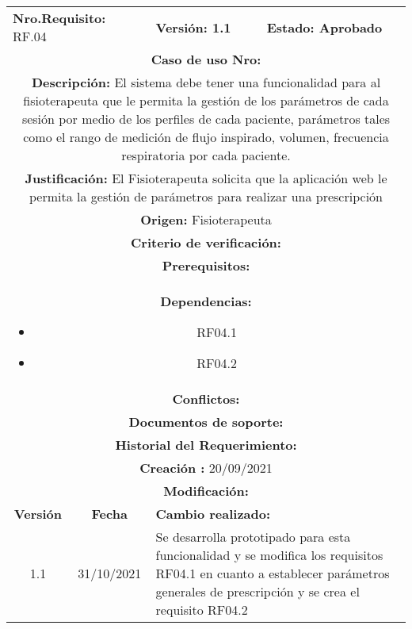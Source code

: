 \begin{center}
        
        \begin{tabular}{|c|c|p{4cm}|p{4cm}|}
            \hline
            \rowcolor{yellow} \multicolumn{4}{|c|}{\textbf{Prioridad:} Baja}  \\
            \hline
            \multicolumn{2}{|l}{\textbf{Nro.Requisito: }RF.04} & \multicolumn{1}{l|}{\textbf{Versión: 1.1 }} & \multicolumn{1}{|l|}{\textbf{Estado: Aprobado}}  \\
            \multicolumn{4}{|p{12cm}|}{\textbf{Caso de uso Nro: }}  \\
            \hline
            \multicolumn{4}{|p{13cm}|}{\textbf{Descripción: }El sistema debe tener una funcionalidad para al fisioterapeuta que le permita la gestión de los parámetros de cada sesión por medio de los perfiles de cada paciente, parámetros tales como el rango de medición de flujo inspirado, volumen, frecuencia respiratoria por cada paciente.}  \\
            \multicolumn{4}{|p{13cm}|}{\textbf{Justificación: }El Fisioterapeuta solicita que la aplicación web le permita la gestión de parámetros para realizar una prescripción}  \\
            \multicolumn{4}{|p{12cm}|}{\textbf{Origen: }Fisioterapeuta}  \\
            \multicolumn{4}{|p{13cm}|}{\textbf{Criterio de verificación: }}  \\
            \hline
            \multicolumn{4}{|p{13cm}|}{\textbf{Prerequisitos: }}  \\
            \hline \multicolumn{4}{|p{12cm}|}{\textbf{Dependencias: }
                \begin{itemize}
                \item RF04.1
                \item RF04.2
                \end{itemize}}  \\
            \multicolumn{4}{|p{12cm}|}{\textbf{Conflictos: }}  \\
            \hline
            \multicolumn{4}{|p{12cm}|}{\textbf{Documentos de soporte: }}  \\
            \hline
            \multicolumn{4}{|p{12cm}|}{\textbf{Historial del Requerimiento: }}  \\
            \multicolumn{4}{|p{12cm}|}{\textbf{Creación : }20/09/2021}  \\
            \multicolumn{4}{|p{12cm}|}{\textbf{Modificación: }}  \\
             \textbf{Versión} & \textbf{Fecha} & \multicolumn{2}{p{8cm}|}{\textbf{Cambio realizado:}} \\
            \hline
               1.1    &31/10/2021 &   \multicolumn{2}{p{8cm}|}{Se desarrolla prototipado para esta funcionalidad y se modifica los requisitos RF04.1 en cuanto a establecer parámetros generales de prescripción y se crea el requisito RF04.2}
              \\
            \hline
        \end{tabular}
        

\end{center}
